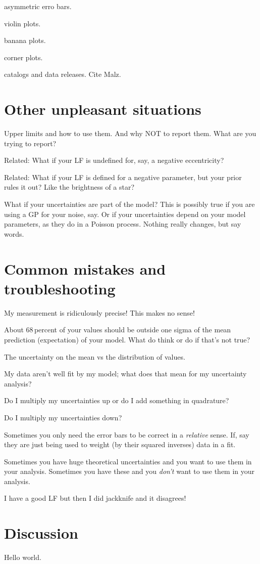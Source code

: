 \documentclass[10pt]{article}
\begin{document}
asymmetric erro bars.

violin plots.

banana plots.

corner plots.

catalogs and data releases. Cite Malz.

\section{Other unpleasant situations}

Upper limits and how to use them. And why NOT to report them. What are
you trying to report?

Related: What if your LF is undefined for, say, a negative eccentricity?

Related: What if your LF is defined for a negative parameter, but your
prior rules it out? Like the brightness of a star?

What if your uncertainties are part of the model? This is possibly
true if you are using a GP for your noise, say. Or if your
uncertainties depend on your model parameters, as they do in a Poisson
process. Nothing really changes, but say words.

\section{Common mistakes and troubleshooting}

My measurement is ridiculously precise! This makes no sense!

About 68\,percent of your values should be outside one sigma of the
mean prediction (expectation) of your model. What do think or do if
that's not true?

The uncertainty on the mean vs the distribution of values.

My data aren't well fit by my model; what does that mean for my uncertainty
analysis?

Do I multiply my uncertainties up or do I add something in quadrature?

Do I multiply my uncertainties down?

Sometimes you only need the error bars to be correct in a
\emph{relative} sense. If, say they are just being used to weight (by
their squared inverses) data in a fit.

Sometimes you have huge theoretical uncertainties and you want to use
them in your analysis. Sometimes you have these and you \emph{don't} want
to use them in your analysis.

I have a good LF but then I did jackknife and it disagrees!

\section{Discussion}

Hello world.

\clearpage\raggedright

\end{document}
